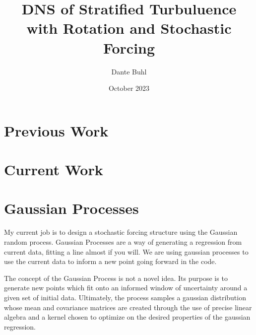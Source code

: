 \documentclass{article}
\title{DNS of Stratified Turbuluence with Rotation and Stochastic Forcing}
\author{Dante Buhl}
\date{October 2023}
\begin{document}
\newcommand{\bs}[1]{\boldsymbol{#1}}
\newcommand{\bmp}[1]{\begin{minipage}{#1\textwidth}}
\newcommand{\emp}{\end{minipage}}
\newcommand{\R}{\mathbb{R}}
\newcommand{\K}{\bs{\mathrm{K}}}


\maketitle

\section{Previous Work}


\section{Current Work}


\section{Gaussian Processes}
\begin{comment}
 \left[\begin{array}{c c c c c}
    0 & \cdots & 0& \cdots& 0 \\
    \vdots & 0 & 0 & \cdots & 0 \\
    0 & 0 & \lambda_{n_c} & 0 & \vdots \\
    \vdots & \vdots & 0 & \ddots & 0 \\
    0 & 0 & \cdots & 0 & \lambda_{n}
    \end{array}\right]    
\end{comment}

My current job is to design a stochastic forcing structure using the Gaussian random process. Gaussian Processes are a way of generating a regression from current data, fitting a line almost if you will. We are using gaussian processes to use the current data to inform a new point going forward in the code. 

The concept of the Gaussian Process is not a novel idea. Its purpose is to generate new points which fit onto an informed window of uncertainty around a given set of initial data. Ultimately, the process samples a gaussian distribution whose mean and covariance matrices are created through the use of precise linear algebra and a kernel chosen to optimize on the desired properties of the gaussian regression. 
\end{document}
